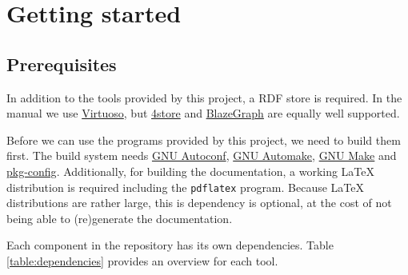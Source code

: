 \chapter{Getting started}

\section{Prerequisites}
\label{sec:prerequisites}

  In addition to the tools provided by this project, a RDF store is required.
  In the manual we use \href{https://virtuoso.openlinksw.com/}{Virtuoso}, but
  \href{https://github.com/4store/4store}{4store} and
  \href{https://www.blazegraph.com/}{BlazeGraph} are equally well supported.

  Before we can use the programs provided by this project, we need to build
  them first.  The build system needs
  \href{https://www.gnu.org/software/autoconf}{GNU Autoconf},
  \href{https://www.gnu.org/software/automake}{GNU Automake},
  \href{https://www.gnu.org/software/make}{GNU Make} and
  \href{https://www.freedesktop.org/wiki/Software/pkg-config/}{pkg-config}.
  Additionally, for building the documentation, a working \LaTeX{} distribution is
  required including the \texttt{pdflatex} program.  Because \LaTeX{} distributions
  are rather large, this is dependency is optional, at the cost of not being able
  to (re)generate the documentation.

  Each component in the repository has its own dependencies.  Table
  \ref{table:dependencies} provides an overview for each tool.

